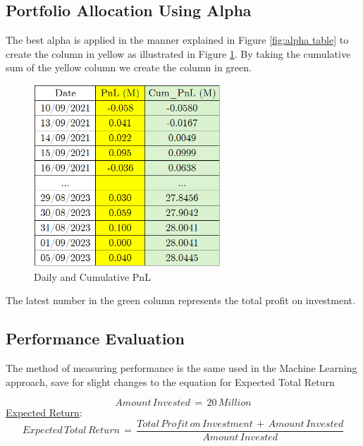 \documentclass[a4paper,12pt]{report}
\renewcommand\thechapter{\Roman{chapter}}
\numberwithin{equation}{section}
\theoremstyle{definition}
\begin{document}
\subsection{Portfolio Allocation Using Alpha}
The best alpha is applied in the manner explained in Figure \ref{fig:alpha table} to create the column in yellow as illustrated in Figure \ref{fig:pnl_table}. By taking the cumulative sum of the yellow column we create the column in green.
\begin{figure}[H]
  \centerline{\includegraphics[width=7cm]{pnl}}
  \caption{Daily and Cumulative PnL}
  \label{fig:pnl_table}
\end{figure}

The latest number in the green column represents the total profit on investment. 
\subsection{Performance Evaluation}


The method of measuring performance is the same used in the Machine Learning approach, save for slight changes to the equation for Expected Total Return

\begin{equation*}
  Amount\,Invested\,=\,20\,Million
\end{equation*}  
\underline{Expected Return}:
\begin{equation*}
  Expected\,Total\,Return\,=\,\frac{Total\,Profit\,on\,Investment\,+\,Amount\,Invested}{Amount\,Invested}
\end{equation*}



\titleformat{\chapter}[block]
  {\normalfont\huge\bfseries}{\thechapter.}{1em}{\Huge\centering}
\titlespacing*{\chapter}{0pt}{150pt}{0pt}
\setcounter{chapter}{2}
\renewcommand{\thechapter}{\Roman{chapter}}
\end{document}
